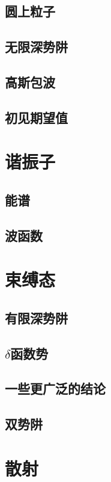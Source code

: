 \documentclass{book}
\begin{document}
\subsection{圆上粒子}%
\subsection{无限深势阱}%
\subsection{高斯包波}%
\subsection{初见期望值}%
\section{谐振子}%
\subsection{能谱}%
\subsection{波函数}%
\section{束缚态}%
\subsection{有限深势阱}%
\subsection{$\delta$函数势}%
\subsection{一些更广泛的结论}%
\subsection{双势阱}%
\section{散射}%
\end{document}
